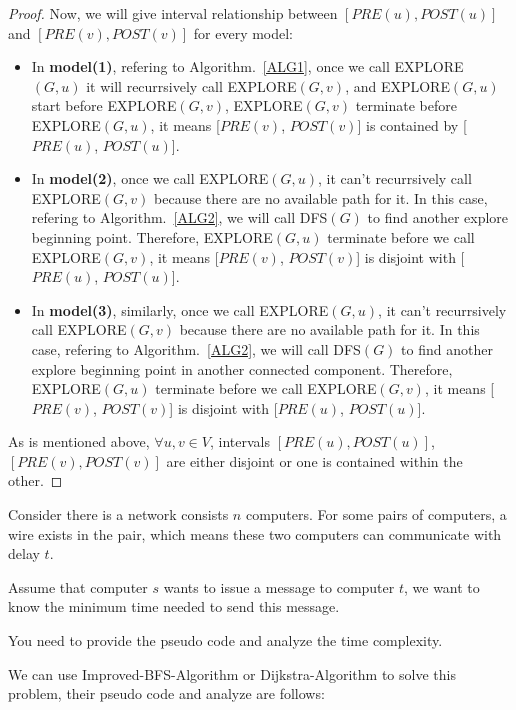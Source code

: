 \documentclass[12pt,a4paper]{article}
\makeatletter
\newtheorem*{solution}{Solution}
\theoremstyle{definition}
\renewenvironment{solution}[1][Solution] {\par\pushQED{\qed}\normalfont\topsep6\p@\@plus6\p@\relax\trivlist\item[\hskip\labelsep\bfseries#1\@addpunct{.}]\ignorespaces}{\popQED\endtrivlist\@endpefalse} \makeatother
\makeatother
\begin{document}
\begin{enumerate}
\begin{proof}
        Now, we will give interval relationship between $[PRE(u), POST(u)]$ and $[PRE(v), POST(v)]$ for every model:\item
        \begin{itemize}
          \item In \textbf{model(1)}, refering to Algorithm.~\ref{ALG1}, once we call EXPLORE$(G,u)$ it will recurrsively call EXPLORE$(G, v)$, and EXPLORE$(G, u)$ start before EXPLORE$(G, v)$, EXPLORE$(G, v)$ terminate before EXPLORE$(G, u)$, it means [$PRE(v)$, $POST(v)$] is contained by [$PRE(u)$, $POST(u)$].
          \item In \textbf{model(2)}, once we call EXPLORE$(G, u)$, it can't recurrsively call EXPLORE$(G, v)$ because there are no available path for it. In this case, refering to Algorithm.~\ref{ALG2}, we will call
           DFS$(G)$ to find another explore beginning point. Therefore, EXPLORE$(G, u)$ terminate before we call EXPLORE$(G, v)$, it means [$PRE(v)$, $POST(v)$] is disjoint with [$PRE(u)$, $POST(u)$].
          \item In \textbf{model(3)}, similarly, once we call EXPLORE$(G, u)$, it can't recurrsively call EXPLORE$(G, v)$ because there are no available path for it. In this case, refering to Algorithm.~\ref{ALG2}, we will call
           DFS$(G)$ to find another explore beginning point in another connected component. Therefore, EXPLORE$(G, u)$ terminate before we call EXPLORE$(G, v)$, it means [$PRE(v)$, $POST(v)$] is disjoint with [$PRE(u)$, $POST(u)$].
        \end{itemize}
        As is mentioned above, $\forall u, v \in V$, intervals $[PRE(u), POST(u)]$, $[PRE(v), POST(v)]$ are either disjoint or one is contained within the other.\par

    \end{proof}
\item
Consider there is a network consists $n$ computers. For some pairs of computers, a wire exists in the pair, which means these two computers can communicate with delay $t$.\par
Assume that computer $s$ wants to issue a message to computer $t$, we want to know the minimum time needed to send this message.\par
You need to provide the pseudo code and analyze the time complexity.\par

    \begin{solution}
        \renewcommand{\qedsymbol}{}
        We can use Improved-BFS-Algorithm or Dijkstra-Algorithm to solve this problem, their pseudo code and analyze are follows:\par


\end{solution}
\end{enumerate}
\end{document}
